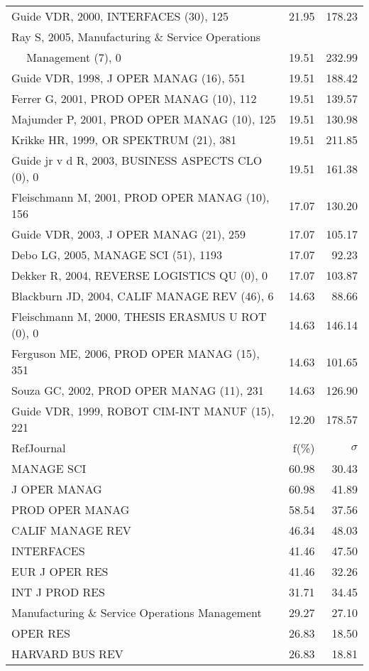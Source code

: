 \documentclass[a4paper,11pt]{report}
\begin{document}
\begin{landscape}
\begin{table}[!ht]
{\begin{tabular}{|l r r|}
Guide VDR, 2000, INTERFACES (30), 125 & 21.95 & 178.23\\
Ray S, 2005, Manufacturing \& Service Operations &  & \\
$\quad$ Management (7), 0 & 19.51 & 232.99\\
Guide VDR, 1998, J OPER MANAG (16), 551 & 19.51 & 188.42\\
Ferrer G, 2001, PROD OPER MANAG (10), 112 & 19.51 & 139.57\\
Majumder P, 2001, PROD OPER MANAG (10), 125 & 19.51 & 130.98\\
Krikke HR, 1999, OR SPEKTRUM (21), 381 & 19.51 & 211.85\\
Guide jr v d R, 2003, BUSINESS ASPECTS CLO (0), 0 & 19.51 & 161.38\\
Fleischmann M, 2001, PROD OPER MANAG (10), 156 & 17.07 & 130.20\\
Guide VDR, 2003, J OPER MANAG (21), 259 & 17.07 & 105.17\\
Debo LG, 2005, MANAGE SCI (51), 1193 & 17.07 & 92.23\\
Dekker R, 2004, REVERSE LOGISTICS QU (0), 0 & 17.07 & 103.87\\
Blackburn JD, 2004, CALIF MANAGE REV (46), 6 & 14.63 & 88.66\\
Fleischmann M, 2000, THESIS ERASMUS U ROT (0), 0 & 14.63 & 146.14\\
Ferguson ME, 2006, PROD OPER MANAG (15), 351 & 14.63 & 101.65\\
Souza GC, 2002, PROD OPER MANAG (11), 231 & 14.63 & 126.90\\
Guide VDR, 1999, ROBOT CIM-INT MANUF (15), 221 & 12.20 & 178.57\\
\hline
\hline
RefJournal & f(\%) & $\sigma$\\
\hline
MANAGE SCI & 60.98 & 30.43\\
J OPER MANAG & 60.98 & 41.89\\
PROD OPER MANAG & 58.54 & 37.56\\
CALIF MANAGE REV & 46.34 & 48.03\\
INTERFACES & 41.46 & 47.50\\
EUR J OPER RES & 41.46 & 32.26\\
INT J PROD RES & 31.71 & 34.45\\
Manufacturing \& Service Operations Management & 29.27 & 27.10\\
OPER RES & 26.83 & 18.50\\
HARVARD BUS REV & 26.83 & 18.81\\
\hline
\end{tabular}
}
\end{table}


\end{landscape}
\end{document}
